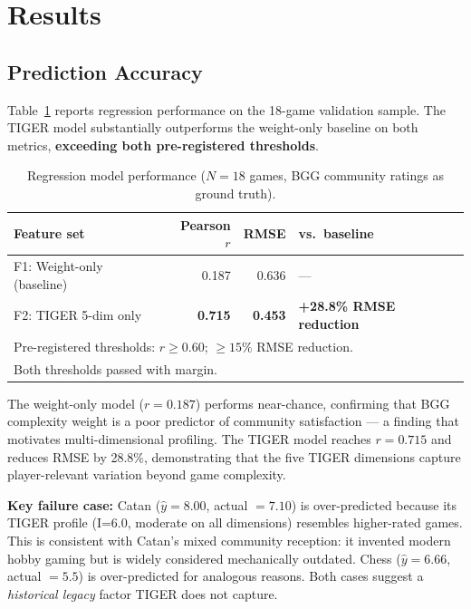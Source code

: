 \section{Results}
\label{sec:results}

\subsection{Prediction Accuracy}

Table~\ref{tab:regression} reports regression performance on the 18-game validation sample.
The TIGER model substantially outperforms the weight-only baseline on both metrics,
\textbf{exceeding both pre-registered thresholds}.

\begin{table}[ht]
\centering
\caption{Regression model performance ($N = 18$ games, BGG community ratings as ground truth).}
\label{tab:regression}
\begin{tabular}{lrrl}
\toprule
\textbf{Feature set} & \textbf{Pearson $r$} & \textbf{RMSE} & \textbf{vs.\ baseline} \\
\midrule
F1: Weight-only (baseline) & 0.187 & 0.636 & --- \\
F2: TIGER 5-dim only       & \textbf{0.715} & \textbf{0.453} & \textbf{+28.8\% RMSE reduction} \\
\bottomrule
\multicolumn{4}{l}{\footnotesize Pre-registered thresholds: $r \geq 0.60$; $\geq 15\%$ RMSE reduction.} \\
\multicolumn{4}{l}{\footnotesize Both thresholds passed with margin.} \\
\end{tabular}
\end{table}

The weight-only model ($r = 0.187$) performs near-chance, confirming that BGG
complexity weight is a poor predictor of community satisfaction --- a finding that
motivates multi-dimensional profiling.
The TIGER model reaches $r = 0.715$ and reduces RMSE by 28.8\%,
demonstrating that the five TIGER dimensions capture player-relevant variation
beyond game complexity.

\textbf{Key failure case:} Catan ($\hat{y} = 8.00$, actual $= 7.10$) is over-predicted
because its TIGER profile (I=6.0, moderate on all dimensions) resembles higher-rated
games. This is consistent with Catan's mixed community reception: it invented modern
hobby gaming but is widely considered mechanically outdated.
Chess ($\hat{y} = 6.66$, actual $= 5.5$) is over-predicted for analogous reasons.
Both cases suggest a \emph{historical legacy} factor TIGER does not capture.

